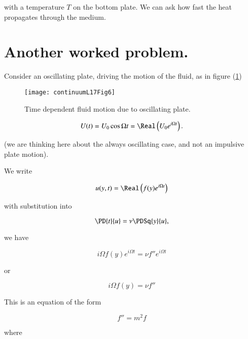 with a temperature $T$ on the bottom plate.  We can ask how fast the heat propagates through the medium.

\section{Another worked problem.}

Consider an oscillating plate, driving the motion of the fluid, as in figure (\ref{fig:continuumL17:continuumL17Fig6})
\begin{figure}[htp]
   \centering
   \texttt{[image: continuumL17Fig6]}
   \caption{Time dependent fluid motion due to oscillating plate.}\label{fig:continuumL17:continuumL17Fig6}
\end{figure}

\begin{equation}\label{eqn:continuumL17:260}
U(t) = U_0 \cos \Omega t = \Real\left( U_0 e^{i \Omega t} \right).
\end{equation}

(we are thinking here about the always oscillating case, and not an impulsive plate motion).

We write

\begin{equation}\label{eqn:continuumL17:280}
u(y, t) = \Real\left( f(y) e^{i \Omega t} \right)
\end{equation}

with substitution into 

\begin{equation}\label{eqn:continuumL17:300}
\PD{t}{u} = \nu \PDSq{y}{u},
\end{equation}

we have

\begin{equation}\label{eqn:continuumL17:320}
i \Omega f(y) e^{i \Omega t} = \nu f'' e^{i \Omega t}
\end{equation}

or

\begin{equation}\label{eqn:continuumL17:340}
i \Omega f(y) = \nu f'' 
\end{equation}

This is an equation of the form

\begin{equation}\label{eqn:continuumL17:360}
f'' = m^2 f
\end{equation}

where

